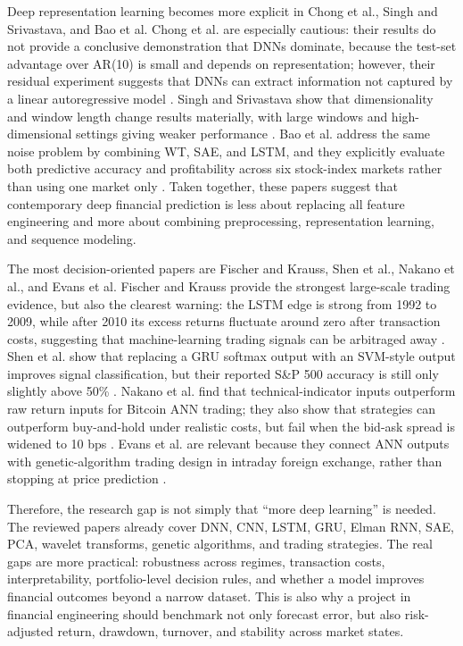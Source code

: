 \documentclass[conference]{IEEEtran}
\begin{document}
Deep representation learning becomes more explicit in Chong et al., Singh and Srivastava, and Bao et al. Chong et al. are especially cautious: their results do not provide a conclusive demonstration that DNNs dominate, because the test-set advantage over AR(10) is small and depends on representation; however, their residual experiment suggests that DNNs can extract information not captured by a linear autoregressive model \cite{chong2017deep}. Singh and Srivastava show that dimensionality and window length change results materially, with large windows and high-dimensional settings giving weaker performance \cite{singh2017stock}. Bao et al. address the same noise problem by combining WT, SAE, and LSTM, and they explicitly evaluate both predictive accuracy and profitability across six stock-index markets rather than using one market only \cite{bao2017deep}. Taken together, these papers suggest that contemporary deep financial prediction is less about replacing all feature engineering and more about combining preprocessing, representation learning, and sequence modeling.

The most decision-oriented papers are Fischer and Krauss, Shen et al., Nakano et al., and Evans et al. Fischer and Krauss provide the strongest large-scale trading evidence, but also the clearest warning: the LSTM edge is strong from 1992 to 2009, while after 2010 its excess returns fluctuate around zero after transaction costs, suggesting that machine-learning trading signals can be arbitraged away \cite{fischer2018deep}. Shen et al. show that replacing a GRU softmax output with an SVM-style output improves signal classification, but their reported S\&P 500 accuracy is still only slightly above 50\% \cite{shen2018gru}. Nakano et al. find that technical-indicator inputs outperform raw return inputs for Bitcoin ANN trading; they also show that strategies can outperform buy-and-hold under realistic costs, but fail when the bid-ask spread is widened to 10 bps \cite{nakano2018bitcoin}. Evans et al. are relevant because they connect ANN outputs with genetic-algorithm trading design in intraday foreign exchange, rather than stopping at price prediction \cite{evans2013utilizing}.

Therefore, the research gap is not simply that ``more deep learning'' is needed. The reviewed papers already cover DNN, CNN, LSTM, GRU, Elman RNN, SAE, PCA, wavelet transforms, genetic algorithms, and trading strategies. The real gaps are more practical: robustness across regimes, transaction costs, interpretability, portfolio-level decision rules, and whether a model improves financial outcomes beyond a narrow dataset. This is also why a project in financial engineering should benchmark not only forecast error, but also risk-adjusted return, drawdown, turnover, and stability across market states.
\end{document}
